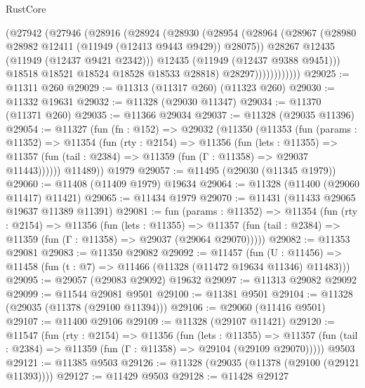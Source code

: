 \begin{lexlean}{RustCore}
\begin{coremodule}
                    (@27942
                      (@27946
                        (@28916
                          (@28924
                            (@28930
                              (@28954
                                (@28964
                                  (@28967
                                    (@28980 @28982 @12411 (@11949 (@12413 @9443 @9429)) @28075))
                                  @28267
                                  @12435
                                  (@11949 (@12437 @9421 @2342)))
                                @12435
                                (@11949 (@12437 @9388 @9451)))
                              @18518
                              @18521
                              @18524
                              @18528
                              @18533
                              @28818)
                            @28297))))))))))))
@29025 := @11311 @260
@29029 := @11313 (@11317 @260) (@11323 @260)
@29030 := @11332 @19631
@29032 := @11328 (@29030 @11347)
@29034 := @11370 (@11371 @260)
@29035 := @11366 @29034
@29037 := @11328 (@29035 @11396)
@29054 := @11327
    (fun (fn : @152) =>
    @29032
      (@11350
        (@11353
          (fun (params : @11352) =>
          @11354
            (fun (rty : @2154) =>
            @11356
              (fun (lets : @11355) =>
              @11357 (fun (tail : @2384) => @11359 (fun (Γ : @11358) => @29037 @11443))))))
        @11489))
    @1979
@29057 := @11495 (@29030 (@11345 @1979))
@29060 := @11408 (@11409 @1979) @19634
@29064 := @11328 (@11400 (@29060 @11417) @11421)
@29065 := @11434 @1979
@29070 := @11431 (@11433 @29065 @19637 @11389 @11391)
@29081 := fun (params : @11352) =>
  @11354
    (fun (rty : @2154) =>
    @11356
      (fun (lets : @11355) =>
      @11357 (fun (tail : @2384) => @11359 (fun (Γ : @11358) => @29037 (@29064 @29070)))))
@29082 := @11353 @29081
@29083 := @11350 @29082
@29092 := @11457
    (fun (U : @11456) => @11458 (fun (t : @7) => @11466 (@11328 (@11472 @19634 @11346) @11483)))
@29095 := @29057 (@29083 @29092) @19632
@29097 := @11313 @29082 @29092
@29099 := @11544 @29081 @9501
@29100 := @11381 @9501
@29104 := @11328 (@29035 (@11378 (@29100 @11394)))
@29106 := @29060 (@11416 @9501)
@29107 := @11400 @29106
@29109 := @11328 (@29107 @11421)
@29120 := @11547
    (fun (rty : @2154) =>
    @11356
      (fun (lets : @11355) =>
      @11357 (fun (tail : @2384) => @11359 (fun (Γ : @11358) => @29104 (@29109 @29070)))))
    @9503
@29121 := @11385 @9503
@29126 := @11328 (@29035 (@11378 (@29100 (@29121 @11393))))
@29127 := @11429 @9503
@29128 := @11428 @29127

\end{coremodule}
\end{lexlean}
